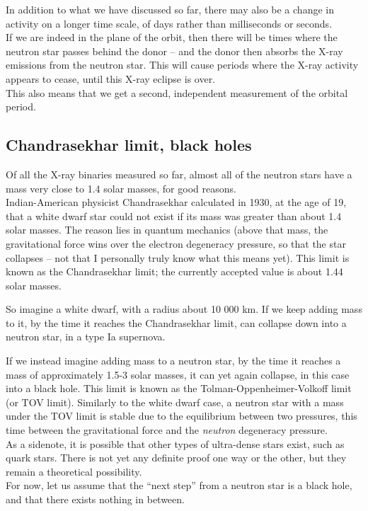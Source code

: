 In addition to what we have discussed so far, there may also be a change in activity on a longer time scale, of days rather than milliseconds or seconds.\\
If we are indeed in the plane of the orbit, then there will be times where the neutron star passes behind the donor -- and the donor then absorbs the X-ray emissions from the neutron star. This will cause periods where the X-ray activity appears to cease, until this X-ray eclipse is over.\\
This also means that we get a second, independent measurement of the orbital period.

\subsection{Chandrasekhar limit, black holes}

Of all the X-ray binaries measured so far, almost all of the neutron stars have a mass very close to 1.4 solar masses, for good reasons.\\
Indian-American physicist Chandrasekhar calculated in 1930, at the age of 19, that a white dwarf star could not exist if its mass was greater than about 1.4 solar masses. The reason lies in quantum mechanics (above that mass, the gravitational force wins over the electron degeneracy pressure, so that the star collapses -- not that I personally truly know what this means yet). This limit is known as the Chandrasekhar limit; the currently accepted value is about 1.44 solar masses.

So imagine a white dwarf, with a radius about 10 000 km. If we keep adding mass to it, by the time it reaches the Chandrasekhar limit, can collapse down into a neutron star, in a type Ia supernova.

If we instead imagine adding mass to a neutron star, by the time it reaches a mass of approximately 1.5-3 solar masses, it can yet again collapse, in this case into a black hole. This limit is known as the Tolman-Oppenheimer-Volkoff limit (or TOV limit). Similarly to the white dwarf case, a neutron star with a mass under the TOV limit is stable due to the equilibrium between two pressures, this time between the gravitational force and the \emph{neutron} degeneracy pressure.\\
As a sidenote, it is possible that other types of ultra-dense stars exist, such as quark stars. There is not yet any definite proof one way or the other, but they remain a theoretical possibility.\\
For now, let us assume that the ``next step'' from a neutron star is a black hole, and that there exists nothing in between.

